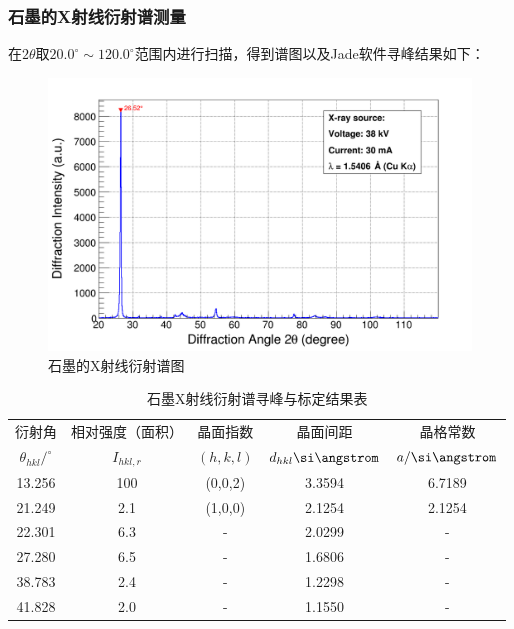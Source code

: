 \documentclass{thuemp}
\begin{document}
\subsubsection{石墨的X射线衍射谱测量}

在$2\theta$取$20.0^\circ \sim 120.0^\circ$范围内进行扫描，得到谱图以及Jade软件寻峰结果如下：

\begin{figure}[H]
    \centering
    \includegraphics[width=0.8\linewidth]{../Data/C-Graphite-multi.png}
    \caption{石墨的X射线衍射谱图}
    \label{fig:graphite_xrd}
\end{figure}

\begin{table}
    \centering
    \captionnamefont{\wuhao\bf\heiti}
    \captiontitlefont{\wuhao\bf\heiti}
    \caption{石墨X射线衍射谱寻峰与标定结果表}
    \label{tab:graphite_xrd}
    \liuhao
    \begin{tabular}{ccccc}
        \toprule
        衍射角 & 相对强度（面积）& 晶面指数 & 晶面间距 & 晶格常数 \\
        $\theta_{hkl}/^\circ$ & $I_{hkl,r}$ & $(h,k,l)$ & $d_{hkl}\text{\si\angstrom}$ & $a/\text{\si\angstrom}$\\
        \midrule
        13.256 & 100 & (0,0,2) & 3.3594 & 6.7189 \\
        21.249 & 2.1 & (1,0,0) & 2.1254 & 2.1254 \\
        22.301 & 6.3 &    -    & 2.0299 &   -    \\
        27.280 & 6.5 &    -    & 1.6806 &   -    \\
        38.783 & 2.4 &    -    & 1.2298 &   -    \\
        41.828 & 2.0 &    -    & 1.1550 &   -    \\
        \bottomrule
    \end{tabular}
\end{table}
\end{document}
